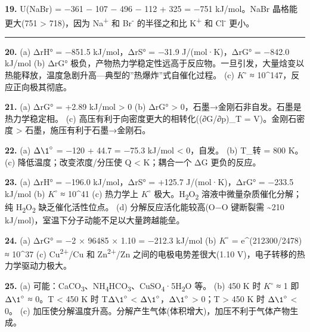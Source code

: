 \documentclass[a4paper,11pt]{ctexart}
\begin{document}
\textbf{19.} U(NaBr) = −361 − 107 − 496 − 112 + 325 = −751 kJ/mol。NaBr 晶格能更大(751 \textgreater{} 718)，因为 Na\textsuperscript{+} 和 Br\textsuperscript{-} 的半径之和比 K\textsuperscript{+} 和 Cl\textsuperscript{-} 更小。

\begin{center}\rule{0.5\linewidth}{0.5pt}\end{center}

\textbf{20.}
(a) ΔrH° = −851.5 kJ/mol，ΔrS° = −31.9 J/(mol·K)，ΔrG° = −842.0 kJ/mol
(b) ΔrG° 极负，产物热力学稳定性远高于反应物。一旦引发，大量焓变以热能释放，温度急剧升高---典型的''热爆炸''式自催化过程。
(c) \(K^{\circ}\) ≈ 10\^{}147，反应正向极其彻底。

\textbf{21.}
(a) ΔrG° = +2.89 kJ/mol \textgreater{} 0
(b) ΔrG° \textgreater{} 0，石墨→金刚石非自发。石墨是热力学稳定相。
(c) 高压有利于向密度更大的相转化((∂G/∂p)\_T = V)。金刚石密度 \textgreater{} 石墨，施压有利于石墨→金刚石。

\textbf{22.}
(a) \(\Delta \1^{\circ}\) = −120 + 44.7 = −75.3 kJ/mol \textless{} 0，自发。
(b) T\_转 = 800 K。
(c) 降低温度；改变浓度/分压使 Q \textless{} K；耦合一个 ΔG 更负的反应。

\textbf{23.}
(a) ΔrH° = −196.0 kJ/mol，ΔrS° = +125.7 J/(mol·K)，ΔrG° = −233.5 kJ/mol
(b) \(K^{\circ}\) ≈ 10\^{}41
(c) 热力学上 \(K^{\circ}\) 极大。H\textsubscript{2}O\textsubscript{2} 溶液中微量杂质催化分解；纯 H\textsubscript{2}O\textsubscript{2} 缺乏催化活性位点。
(d) 分解反应活化能较高(O−O 键断裂需 \textasciitilde210 kJ/mol)，室温下分子动能不足以大量跨越能垒。

\textbf{24.}
(a) ΔrG° = −2 × 96485 × 1.10 = −212.3 kJ/mol
(b) \(K^{\circ}\) = e\^{}(212300/2478) ≈ 10\^{}37
(c) Cu\textsuperscript{2+}/Cu 和 Zn\textsuperscript{2+}/Zn 之间的电极电势差很大(1.10 V)，电子转移的热力学驱动力极大。

\textbf{25.}
(a) 可能：CaCO\textsubscript{3}、NH\textsubscript{4}HCO\textsubscript{3}、CuSO\textsubscript{4}·5H\textsubscript{2}O 等。
(b) 450 K 时 \(K^{\circ}\) ≈ 1 即 \(\Delta \1^{\circ}\) ≈ 0。T \textless{} 450 K 时 T\(\Delta \1^{\circ}\) \textless{} \(\Delta \1^{\circ}\)，\(\Delta \1^{\circ}\) \textgreater{} 0；T \textgreater{} 450 K 时 \(\Delta \1^{\circ}\) \textless{} 0。
(c) 加压使分解温度升高。分解产生气体(体积增大)，加压不利于气体产物生成。
\end{document}
